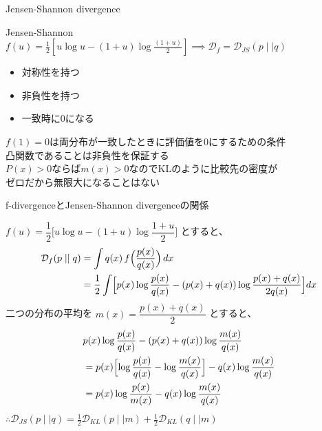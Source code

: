 \begin{frame}{Jensen-Shannon divergence}
    \begin{exampleblock}{Jensen-Shannon}
        \centering$\mathit{f}(u)=\frac{1}{2}[u\log u-(1+u)\log\frac{(1+u)}{2}] \implies \mathcal{D}_{f}=\mathcal{D}_{JS}(p\mid\mid q)$\\
    \end{exampleblock}
        \begin{itemize}
        \item 対称性を持つ
        \item 非負性を持つ
        \item 一致時に0になる
    \end{itemize}
    $f(1)=0$は両分布が一致したときに評価値を0にするための条件\\
    凸関数であることは非負性を保証する\\
    $P(x)>0$ならば$m(x)>0$なのでKLのように比較先の密度が\\ゼロだから無限大になることはない


    \end{frame}
\begin{frame}[shrink]{f-divergenceとJensen-Shannon divergenceの関係}
    \begin{exampleblock}{}
    $\mathit{f}(u)=\dfrac{1}{2}\bigl[u\log u-(1+u)\log\dfrac{1+u}{2}\bigr]$
    とすると、
    \begin{align*}
    \mathcal{D}_{f}(p\mid\mid q)
    &= \int q(x)\,
       f\Bigl(\frac{p(x)}{q(x)}\Bigr)\,dx \\
    &= \frac{1}{2}\int
       \Bigl[
         p(x)\log\frac{p(x)}{q(x)}
         -(p(x)+q(x))\log\frac{p(x)+q(x)}{2q(x)}
       \Bigr]dx
    \end{align*}
    二つの分布の平均を
    $m(x)=\dfrac{p(x)+q(x)}{2}$
    とすると、
    \begin{align*}
        & p(x)\log\frac{p(x)}{q(x)}
          -(p(x)+q(x))\log\frac{m(x)}{q(x)} \\
        &= p(x)\Bigl[
             \log\frac{p(x)}{q(x)}
             -\log\frac{m(x)}{q(x)}
           \Bigr]
           -q(x)\log\frac{m(x)}{q(x)} \\
        &= p(x)\log\frac{p(x)}{m(x)}
           -q(x)\log\frac{m(x)}{q(x)}
        \end{align*}
        \centering$\therefore \mathcal{D}_{JS}(p\mid\mid q)=\frac{1}{2}\mathcal{D}_{KL}(p\mid\mid m)+\frac{1}{2}\mathcal{D}_{KL}(q\mid\mid m)$
    \end{exampleblock}
    \end{frame}
